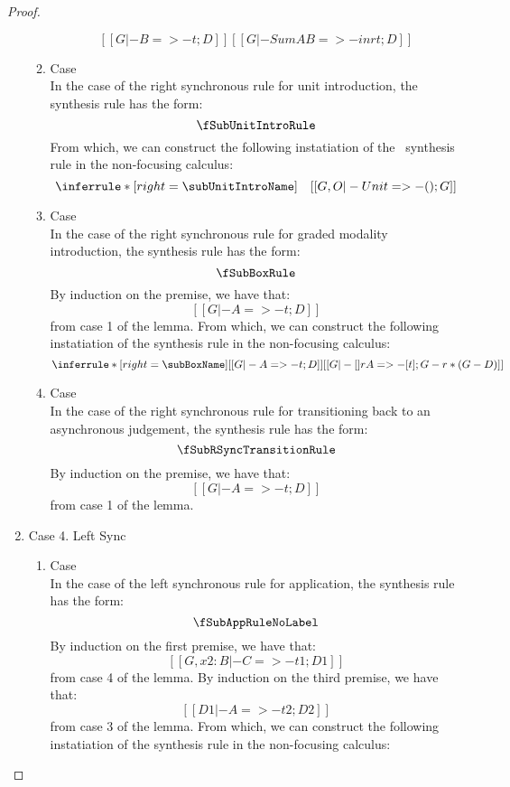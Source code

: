 \begin{proof}
\begin{enumerate}
\begin{enumerate}
\[    {[[G |- B =>- t ; D]]}
    {[[G |- Sum A B =>- inr t ; D]]}
          \]
        \item Case \subUnitIntroName \\
          In the case of the right synchronous rule for unit introduction, the synthesis rule has the form:
          \[
          \fSubUnitIntroRule
          \]
          From which, we can construct the following instatiation of the \subUnitIntroName\ synthesis rule in the non-focusing calculus:
          \[
    \inferrule*[right=\subUnitIntroName]
    {\quad}
    {[[G , O |- Unit =>- () ; G]]}
          \]
        \item Case \subBoxName \\
          In the case of the right synchronous rule for graded modality introduction, the synthesis rule has the form:
          \[
          \fSubBoxRule
          \]
          By induction on the premise, we have that:
          \[
            [[G |- A =>- t ; D]] \tag{ih}
          \]
          from case 1 of the lemma. From which, we can construct the following instatiation of the \subBoxName synthesis rule in the non-focusing calculus:
          \[
  \inferrule*[right=\subBoxName]
  {[[G |- A =>- t ; D]]}{[[G |- [] r A =>- [t] ; G - r * (G - D)]]}
          \]
      \item Case \fSubRSyncTransitionName \\
          In the case of the right synchronous rule for transitioning back to an asynchronous judgement, the synthesis rule has the form:
          \[
            \fSubRSyncTransitionRule
          \]
          By induction on the premise, we have that:
          \[
            [[ G |- A =>- t ; D ]] \tag{ih}
          \]
          from case 1 of the lemma.
      \end{enumerate}
    \item Case 4. Left Sync \\
      \begin{enumerate}
          \item Case \subAppName \\
          In the case of the left synchronous rule for application, the synthesis rule has the form:
          \[
          \fSubAppRuleNoLabel
          \]
          By induction on the first premise, we have that:
          \[
            [[G, x2 : B |- C =>- t1 ; D1]] \tag{ih1}
          \]
          from case 4 of the lemma. By induction on the third premise, we have that:
          \[
            [[D1 |- A =>- t2 ; D2]] \tag{ih2}
          \]
          from case 3 of the lemma. From which, we can construct the following instatiation of the \subAppName synthesis rule in the non-focusing calculus:

\end{enumerate}
\end{enumerate}
\end{proof}
